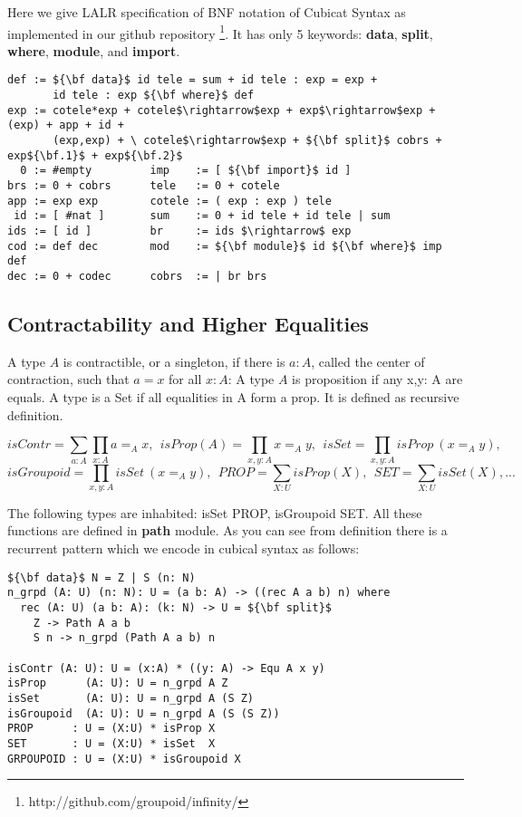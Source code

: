 \documentclass{article}
\begin{document}
Here we give LALR specification of BNF notation of Cubicat Syntax as implemented
in our github repository \footnote{http://github.com/groupoid/infinity/}. It has
only 5 keywords: {\bf data}, {\bf split}, {\bf where}, {\bf module}, and {\bf import}.

\begin{lstlisting}[mathescape=true]
def := ${\bf data}$ id tele = sum + id tele : exp = exp +
       id tele : exp ${\bf where}$ def
exp := cotele*exp + cotele$\rightarrow$exp + exp$\rightarrow$exp + (exp) + app + id +
       (exp,exp) + \ cotele$\rightarrow$exp + ${\bf split}$ cobrs + exp${\bf.1}$ + exp${\bf.2}$
  0 := #empty         imp    := [ ${\bf import}$ id ]
brs := 0 + cobrs      tele   := 0 + cotele
app := exp exp        cotele := ( exp : exp ) tele
 id := [ #nat ]       sum    := 0 + id tele + id tele | sum
ids := [ id ]         br     := ids $\rightarrow$ exp
cod := def dec        mod    := ${\bf module}$ id ${\bf where}$ imp def
dec := 0 + codec      cobrs  := | br brs
\end{lstlisting}

\subsection{Contractability and Higher Equalities}

A type $A$ is contractible, or a singleton, if there is $a : A$,
called the center of contraction, such that $a = x$ for all $x : A$:
A type $A$ is proposition if any x,y: A are equals.
A type is a Set if all equalities in A form a prop.
It is defined as recursive definition.

$$isContr = \sum_{a:A}\prod_{x:A} a =_A x,\ \ 
  isProp(A) = \prod_{x,y:A} x =_A y,\ \ 
  isSet = \prod_{x,y:A} isProp\ (x =_A y),\ \ $$
$$isGroupoid = \prod_{x,y:A} isSet\ (x =_A y),\ \ 
  PROP = \sum_{X:U}isProp(X),\ \ 
  SET = \sum_{X:U}isSet(X),...$$

The following types are inhabited: isSet PROP, isGroupoid SET.
All these functions are defined in {\bf path} module. As you can see
from definition there is a recurrent pattern which we encode in cubical syntax
as follows:

\begin{lstlisting}[mathescape=true]
${\bf data}$ N = Z | S (n: N)
n_grpd (A: U) (n: N): U = (a b: A) -> ((rec A a b) n) where
  rec (A: U) (a b: A): (k: N) -> U = ${\bf split}$
    Z -> Path A a b
    S n -> n_grpd (Path A a b) n

isContr (A: U): U = (x:A) * ((y: A) -> Equ A x y)
isProp      (A: U): U = n_grpd A Z
isSet       (A: U): U = n_grpd A (S Z)
isGroupoid  (A: U): U = n_grpd A (S (S Z))
PROP      : U = (X:U) * isProp X
SET       : U = (X:U) * isSet  X
GRPOUPOID : U = (X:U) * isGroupoid X
\end{lstlisting}
\end{document}

